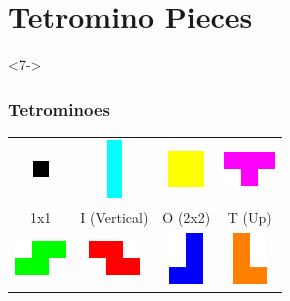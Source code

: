 \documentclass[9pt,table,xcolor=dvipsnames]{beamer}
\begin{document}
\section{Tetromino Pieces}
\begin{frame}<7-> %
  \frametitle{Tetrominoes}

  \begin{center}
    \renewcommand{\arraystretch}{1.2}
    \begin{tabular}{cccc}
      \includegraphics[height=0.425cm]{tetromino/Tetromino_1x1_Single.png} &
      \includegraphics[height=1.55cm]{tetromino/Tetromino_I_Vertical.png} &
      \includegraphics[height=0.95cm]{tetromino/Tetromino_O_Single.png} &
      \includegraphics[height=0.90cm]{tetromino/Tetromino_T_Up.png} \\
      {\small 1x1} & {\small I (Vertical)} & {\small O (2x2)} & {\small T (Up)} \\
      \includegraphics[height=0.90cm]{tetromino/Tetromino_S_Horizontal.png} &
      \includegraphics[height=0.90cm]{tetromino/Tetromino_Z_Horizontal.png} &
      \includegraphics[height=1.35cm]{tetromino/Tetromino_J_Up.png} &
      \includegraphics[height=1.35cm]{tetromino/Tetromino_L_Up.png} \\

\end{tabular}
\end{center}
\end{frame}
\end{document}
